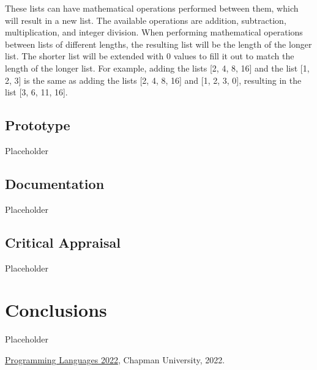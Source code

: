 \documentclass{article}
\theoremstyle{theorem}
\theoremstyle{definition}
\theoremstyle{remark}
\begin{document}
\medskip\noindent
These lists can have mathematical operations performed between them, which will result in a new list. The available operations are addition, subtraction, multiplication, and integer division. When performing mathematical operations between lists of different lengths, the resulting list will be the length of the longer list. The shorter list will be extended with 0 values to fill it out to match the length of the longer list. For example, adding the lists [2, 4, 8, 16] and the list [1, 2, 3] is the same as adding the lists [2, 4, 8, 16] and [1, 2, 3, 0], resulting in the list [3, 6, 11, 16].

\subsection{Prototype}

Placeholder

\subsection{Documentation}

Placeholder

\subsection{Critical Appraisal}

Placeholder

\section{Conclusions}\label{conclusions}

Placeholder

\begin{thebibliography}{99}
 \href{https://github.com/alexhkurz/programming-languages-2022/blob/main/README.md}{Programming Languages 2022}, Chapman University, 2022.
\end{thebibliography}
\end{document}
